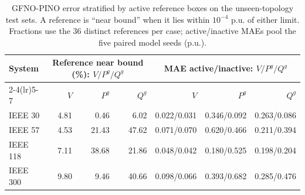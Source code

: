 \begin{table}[t]
\centering
\caption{GFNO-PINO error stratified by active reference boxes on the unseen-topology
test sets. A reference is ``near bound'' when it lies within $10^{-4}$ p.u. of
either limit. Fractions use the 36 distinct references per case; active/inactive
MAEs pool the five paired model seeds (p.u.).}
\label{tab:active_bounds}
\scriptsize
\begin{tabular}{lrrrrrr}
\toprule
System & \multicolumn{3}{c}{Reference near bound (\%): $V/P^g/Q^g$} &
\multicolumn{3}{c}{MAE active/inactive: $V/P^g/Q^g$} \\
\cmidrule(lr){2-4}\cmidrule(lr){5-7}
 & $V$ & $P^g$ & $Q^g$ & $V$ & $P^g$ & $Q^g$ \\
\midrule
IEEE 30  & 4.81 & 0.46 & 6.02 & 0.022/0.031 & 0.346/0.092 & 0.263/0.086 \\
IEEE 57  & 4.53 & 21.43 & 47.62 & 0.071/0.070 & 0.620/0.466 & 0.211/0.394 \\
IEEE 118 & 7.11 & 38.68 & 21.86 & 0.048/0.042 & 0.180/0.525 & 0.198/0.204 \\
IEEE 300 & 9.80 & 9.46 & 40.66 & 0.098/0.066 & 0.393/0.682 & 0.285/0.476 \\
\bottomrule
\end{tabular}
\end{table}
